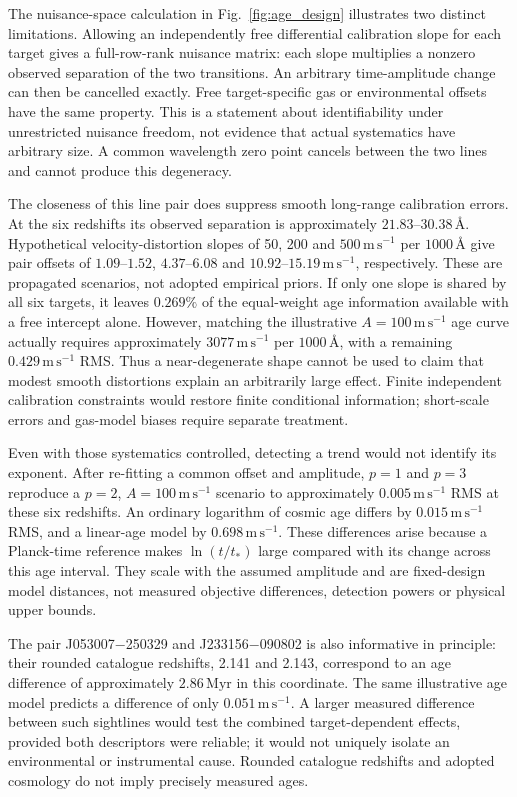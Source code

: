The nuisance-space calculation in Fig.~\ref{fig:age_design} illustrates two distinct limitations. Allowing an independently free differential calibration slope for each target gives a full-row-rank nuisance matrix: each slope multiplies a nonzero observed separation of the two transitions. An arbitrary time-amplitude change can then be cancelled exactly. Free target-specific gas or environmental offsets have the same property. This is a statement about identifiability under unrestricted nuisance freedom, not evidence that actual systematics have arbitrary size. A common wavelength zero point cancels between the two lines and cannot produce this degeneracy.

The closeness of this line pair does suppress smooth long-range calibration errors. At the six redshifts its observed separation is approximately $21.83$--$30.38\,\text{\AA}$. Hypothetical velocity-distortion slopes of 50, 200 and $500\,\mathrm{m\,s^{-1}}$ per $1000\,\text{\AA}$ give pair offsets of $1.09$--$1.52$, $4.37$--$6.08$ and $10.92$--$15.19\,\mathrm{m\,s^{-1}}$, respectively. These are propagated scenarios, not adopted empirical priors. If only one slope is shared by all six targets, it leaves $0.269\%$ of the equal-weight age information available with a free intercept alone. However, matching the illustrative $A=100\,\mathrm{m\,s^{-1}}$ age curve actually requires approximately $3077\,\mathrm{m\,s^{-1}}$ per $1000\,\text{\AA}$, with a remaining $0.429\,\mathrm{m\,s^{-1}}$ RMS. Thus a near-degenerate shape cannot be used to claim that modest smooth distortions explain an arbitrarily large effect. Finite independent calibration constraints would restore finite conditional information; short-scale errors and gas-model biases require separate treatment.

Even with those systematics controlled, detecting a trend would not identify its exponent. After re-fitting a common offset and amplitude, $p=1$ and $p=3$ reproduce a $p=2$, $A=100\,\mathrm{m\,s^{-1}}$ scenario to approximately $0.005\,\mathrm{m\,s^{-1}}$ RMS at these six redshifts. An ordinary logarithm of cosmic age differs by $0.015\,\mathrm{m\,s^{-1}}$ RMS, and a linear-age model by $0.698\,\mathrm{m\,s^{-1}}$. These differences arise because a Planck-time reference makes $\ln(t/t_*)$ large compared with its change across this age interval. They scale with the assumed amplitude and are fixed-design model distances, not measured objective differences, detection powers or physical upper bounds.

The pair J053007$-$250329 and J233156$-$090802 is also informative in principle: their rounded catalogue redshifts, 2.141 and 2.143, correspond to an age difference of approximately $2.86\,\mathrm{Myr}$ in this coordinate. The same illustrative age model predicts a difference of only $0.051\,\mathrm{m\,s^{-1}}$. A larger measured difference between such sightlines would test the combined target-dependent effects, provided both descriptors were reliable; it would not uniquely isolate an environmental or instrumental cause. Rounded catalogue redshifts and adopted cosmology do not imply precisely measured ages.

